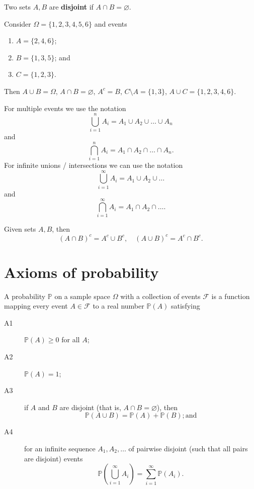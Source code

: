 \begin{definition}[Disjoint]
    Two sets $A, B$ are \textbf{disjoint} if $A \cap B = \varnothing$.
\end{definition}

\begin{example}
    Consider $\Omega = \{ 1, 2, 3, 4, 5, 6 \}$ and events
    \begin{enumerate}
        \item $A = \{ 2, 4, 6 \}$;
        \item $B = \{ 1, 3, 5 \}$; and
        \item $C = \{ 1, 2, 3 \}$.
    \end{enumerate}
    Then $A \cup B = \Omega$, $A \cap B = \varnothing$, $A^c = B$, $C \setminus A = \{ 1, 3 \}$, $A \cup C = \{ 1, 2, 3, 4, 6 \}$.
\end{example}

\begin{remark}
    For multiple events we use the notation \[ \bigcup\limits_{i = 1}^{n} A_i = A_1 \cup A_2 \cup \ldots \cup A_n \] and \[ \bigcap\limits_{i = 1}^{n} A_i = A_1 \cap A_2 \cap \ldots \cap A_n. \] For infinite unions / intersections we can use the notation \[ \bigcup\limits_{i = 1}^{\infty} A_i = A_1 \cup A_2 \cup \ldots \] and \[ \bigcap\limits_{i = 1}^{\infty} A_i = A_1 \cap A_2 \cap \ldots. \]
\end{remark}

\begin{definition}
    Given sets $A, B$, then \[ (A \cap B)^c = A^c \cup B^c, \quad (A \cup B)^c = A^c \cap B^c. \]
\end{definition}

\section{Axioms of probability}

\begin{definition}
    A probability $\mathbb{P}$ on a sample space $\Omega$ with a collection of events $\mathcal{F}$ is a function mapping every event $A \in \mathcal{F}$ to a real number $\mathbb{P}(A)$ satisfying
    \begin{description}
        \item[A1] $\mathbb{P}(A) \geq 0$ for all $A$;
        \item[A2] $\mathbb{P}(A) = 1$;
        \item[A3] if $A$ and $B$ are disjoint (that is, $A \cap B = \varnothing$), then \[ \mathbb{P}(A \cup B) = \mathbb{P}(A) + \mathbb{P}(B); \text{and} \]
        \item[A4] for an infinite sequence $A_1, A_2, \ldots$ of pairwise disjoint (such that all pairs are disjoint) events \[ \mathbb{P} \left( \bigcup\limits_{i=1}^\infty A_i \right) = \sum_{i=1}^\infty \mathbb{P}(A_i). \]
    \end{description}
\end{definition}

